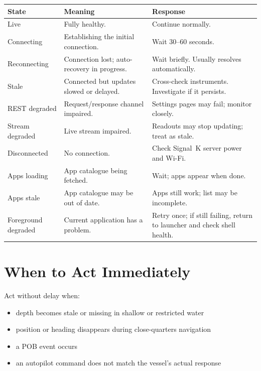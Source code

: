 \begin{longtable}{L{3.2cm}L{4.8cm}L{5.7cm}}
\toprule
{}
\color{white}\sffamily\bfseries State &
\color{white}\sffamily\bfseries Meaning &
\color{white}\sffamily\bfseries Response \\
\midrule
Live               & Fully healthy. &
  Continue normally. \\
Connecting         & Establishing the initial connection. &
  Wait 30--60 seconds. \\
Reconnecting       & Connection lost; auto-recovery in progress. &
  Wait briefly. Usually resolves automatically. \\
Stale              & Connected but updates slowed or delayed. &
  Cross-check instruments. Investigate if it persists. \\
REST degraded      & Request/response channel impaired. &
  Settings pages may fail; monitor closely. \\
Stream degraded    & Live stream impaired. &
  Readouts may stop updating; treat as stale. \\
Disconnected       & No connection. &
  Check Signal~K server power and Wi-Fi. \\
Apps loading       & App catalogue being fetched. &
  Wait; apps appear when done. \\
Apps stale         & App catalogue may be out of date. &
  Apps still work; list may be incomplete. \\
Foreground degraded& Current application has a problem. &
  Retry once; if still failing, return to launcher and check shell health. \\
\bottomrule
\end{longtable}

\section{When to Act Immediately}

Act without delay when:

\begin{itemize}
  \item depth becomes stale or missing in shallow or restricted water
  \item position or heading disappears during close-quarters navigation
  \item a POB event occurs
  \item an autopilot command does not match the vessel's actual response
\end{itemize}

